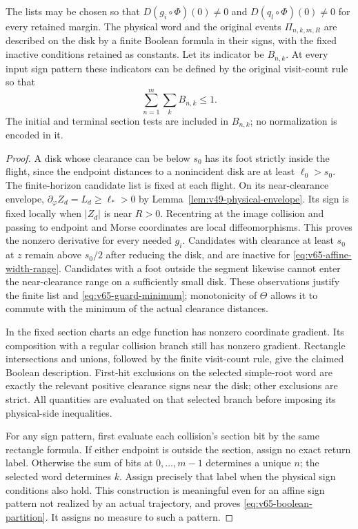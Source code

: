 \begin{lemma}
\label{lem:v65-margin-description}
The lists may be chosen so that
$D(g_i\circ\Phi)(0)\ne0$ and $D(q_l\circ\Phi)(0)\ne0$ for every
retained margin. The physical word and the original events
$\Pi_{n,k,m,R}$ are described on the disk by a finite Boolean formula
in their signs, with the fixed inactive conditions retained as constants.
Let its indicator be $B_{n,k}$. At every input sign pattern these
indicators can be defined by the original visit-count rule so that
\begin{equation}\label{eq:v65-boolean-partition}
 \sum_{n=1}^m\sum_k B_{n,k}\le1.
\end{equation}
The initial and terminal section tests are included in $B_{n,k}$;
no normalization is encoded in it.
\end{lemma}
\begin{proof}
A disk whose clearance can be below $s_0$ has its foot strictly
inside the flight, since the endpoint distances to a nonincident
disk are at least $\ell_0>s_0$. The finite-horizon candidate list
is fixed at each flight. On its near-clearance envelope,
$\partial_\varphi Z_d=L_d\ge\ell_*>0$ by
Lemma~\ref{lem:v49-physical-envelope}. Its sign is fixed locally
when $|Z_d|$ is near $R>0$. Recentring at the image collision and
passing to endpoint and Morse coordinates are local diffeomorphisms.
This proves the nonzero derivative for every needed $g_i$.
Candidates with clearance at least $s_0$ at $z$ remain above
$s_0/2$ after reducing the disk, and are inactive for
\eqref{eq:v65-affine-width-range}. Candidates with a foot outside
the segment likewise cannot enter the near-clearance range on a
sufficiently small disk. These observations justify the finite list
and \eqref{eq:v65-guard-minimum}; monotonicity of $\Theta$ allows it
to commute with the minimum of the actual clearance distances.

In the fixed section charts an edge function has nonzero coordinate
gradient. Its composition with a regular collision branch still has
nonzero gradient. Rectangle intersections and unions, followed by the
finite visit-count rule, give the claimed Boolean description. First-hit
exclusions on the selected simple-root word are exactly the relevant
positive clearance signs near the disk; other exclusions are strict.
All quantities are evaluated on that selected branch before imposing
its physical-side inequalities.

For any sign pattern, first evaluate each collision's section bit by
the same rectangle formula. If either endpoint is outside the section,
assign no exact return label. Otherwise the sum of bits at
$0,\ldots,m-1$ determines a unique $n$; the selected word determines
$k$. Assign precisely that label when the physical sign conditions
also hold. This construction is meaningful even for an affine sign
pattern not realized by an actual trajectory, and proves
\eqref{eq:v65-boolean-partition}. It assigns no measure to such a
pattern.
\end{proof}

